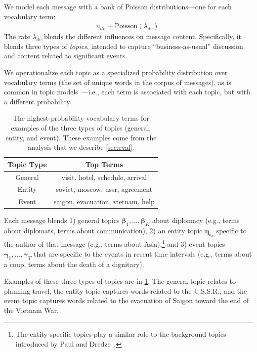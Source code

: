 We model each message with a bank of Poisson distributions---one for
each vocabulary term:
\begin{align}
  n_{dv} \sim \textrm{Poisson}\left(\lambda_{dv}\right).
\end{align}
The rate $\lambda_{dv}$ blends the different influences on message
content. Specifically, it blends three types of \emph{topics},
intended to capture ``business-as-usual'' discussion and content
related to significant events.

We operationalize each topic as a specialized probability distribution
over vocabulary terms (the set of unique words in the corpus of
messages), as is common in topic
models~\cite{Blei:2003,canny2004gap,Gopalan:2014b}---i.e., each term
is associated with each topic, but with a different probability.

\begin{table}
\centering
\small
\begin{tabular}{cc}
\toprule
Topic Type & Top Terms \\
\midrule
General & visit, hotel, schedule, arrival \\
Entity & soviet, moscow, ussr, agreement \\
Event & saigon, evacuation, vietnam, help \\
\bottomrule
\end{tabular}
\caption{The highest-probability vocabulary terms for examples of the
  three types of topics (general, entity, and event). These examples
  come from the analysis that we describe \cref{sec:eval}.}
\label{tab:3topics}
\end{table}

Each message blends 1) general topics $\mathbold{\beta}_1, \ldots,
\mathbold{\beta}_K$ about diplomacy (e.g., terms about diplomats,
terms about communication), 2) an entity topic $\mathbold{\eta}_{a_d}$
specific to the author of that message (e.g., terms about
Asia),\footnote{The entity-specific topics play a similar role to the
  background topics introduced by Paul and
  Dredze~.} and 3) event topics
$\mathbold{\gamma}_1, \ldots, \mathbold{\gamma}_T$ that are specific
to the events in recent time intervals (e.g., terms about a coup,
terms about the death of a dignitary).

Examples of these three types of topics are in \cref{tab:3topics}. The
general topic relates to planning travel, the entity topic captures
words related to the U.S.S.R., and the event topic captures words
related to the evacuation of Saigon toward the end of the Vietnam War.

